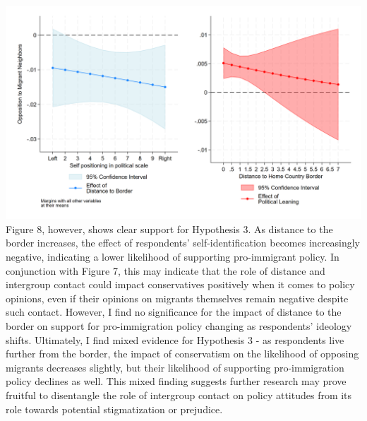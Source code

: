 \documentclass[12pt,]{article}
\begin{document}
\includegraphics{figures/m5_marginal_1.png} Figure 8, however, shows
clear support for Hypothesis 3. As distance to the border increases, the
effect of respondents' self-identification becomes increasingly
negative, indicating a lower likelihood of supporting pro-immigrant
policy. In conjunction with Figure 7, this may indicate that the role of
distance and intergroup contact could impact conservatives positively
when it comes to policy opinions, even if their opinions on migrants
themselves remain negative despite such contact. However, I find no
significance for the impact of distance to the border on support for
pro-immigration policy changing as respondents' ideology shifts.
Ultimately, I find mixed evidence for Hypothesis 3 - as respondents live
further from the border, the impact of conservatism on the likelihood of
opposing migrants decreases slightly, but their likelihood of supporting
pro-immigration policy declines as well. This mixed finding suggests
further research may prove fruitful to disentangle the role of
intergroup contact on policy attitudes from its role towards potential
stigmatization or prejudice.
\end{document}
